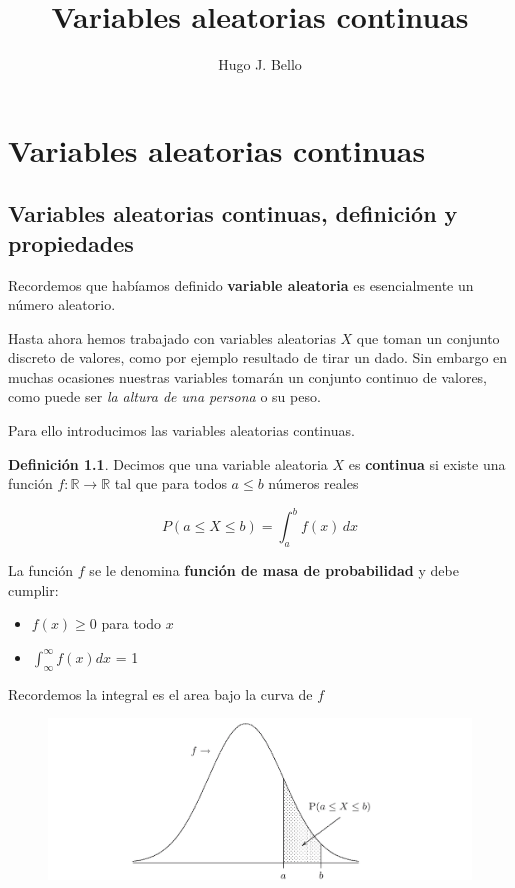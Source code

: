 \documentclass[]{book}
\title{Variables aleatorias continuas}
\author{Hugo J. Bello}
\date{}
\providecommand{\tightlist}{%
  \setlength{\itemsep}{0pt}\setlength{\parskip}{0pt}}
\theoremstyle{plain}
\theoremstyle{definition}
\newtheorem{definition}[theorem]{Definición}
\theoremstyle{definition} %
\begin{document}
\chapter{Variables aleatorias continuas}

\section{Variables aleatorias continuas, definición y
propiedades} 

Recordemos que habíamos definido \textbf{variable aleatoria} es
esencialmente un número aleatorio.

Hasta ahora hemos trabajado con variables aleatorias \(X\) que toman un
conjunto discreto de valores, como por ejemplo resultado de tirar un
dado. Sin embargo en muchas ocasiones nuestras variables tomarán un
conjunto continuo de valores, como puede ser \emph{la altura de una
persona} o su peso.

Para ello introducimos las variables aleatorias continuas.


\begin{definition}
  Decimos que una variable aleatoria \(X\) es \textbf{continua} si existe
una función \(f:\mathbb R \to \mathbb R\) tal que para todos \(a\leq b\)
números reales

\[\displaystyle P(a\leq X\leq b)=\int _{a}^{b}f(x)\,dx\]

La función \(f\) se le denomina \textbf{función de masa de probabilidad}
y debe cumplir:

\begin{itemize}
\tightlist
\item
  \(f(x)\geq 0\) para todo \(x\)
\item
  \(\int^\infty_\infty f(x)dx\) = 1
\end{itemize}

Recordemos la integral es el area bajo la curva de \(f\)

\end{definition}


\begin{figure}
  \centering
  \includegraphics[width=5in,height=\textheight]{img/sc_1.png}
  \caption{ }
\end{figure} 
\end{document}
